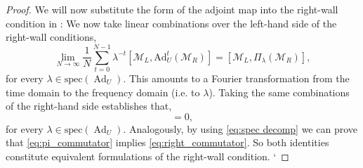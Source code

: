 \documentclass[11pt, twocolumn, floatfix, superscriptaddress, aps, prb, raggedbottom]{revtex4-2}
\DeclareMathOperator{\Ad}{Ad}
\begin{document}
\begin{proof}
We will now substitute the form of the adjoint map into the right-wall condition  in :
We now take linear combinations over the left-hand side of the right-wall conditions,
\begin{equation*}
  \lim_{N\rightarrow \infty}\frac{1}{N}\sum_{t=0}^{N-1} \lambda^{-t} [\mathcal{M}_L, \mathrm{Ad}_U^t(\mathcal{M}_R)] = [\mathcal{M}_L, \Pi_{\lambda}(\mathcal{M}_R)],
\end{equation*}
for every $\lambda \in \mathrm{spec}(\Ad_U)$.
This amounts to a Fourier transformation from the time domain to the frequency domain (i.e. to $\lambda$).
Taking the same combinations of the right-hand side establishes that,
\begin{equation}
  [\mathcal{M}_L, \Pi_{\lambda}(\mathcal{M}_R)] =0,\label{eq:pi_commutator}
\end{equation}
for every $\lambda\in\mathrm{spec}(\Ad_U)$.
Analogously, by using \eqref{eq:spec decomp} we can prove that \eqref{eq:pi_commutator} implies \eqref{eq:right_commutator}. So both identities constitute equivalent formulations of the right-wall condition. `


\end{proof}
\end{document}
